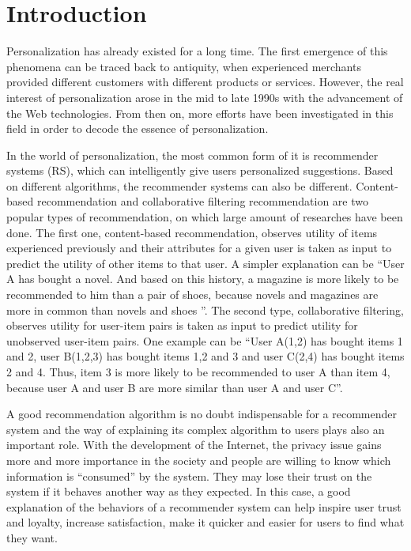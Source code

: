 \section{Introduction}

  \indent Personalization has already existed for a long time. The first emergence of this phenomena 
  can be traced back to antiquity,
  when experienced merchants provided different customers with different products or services\cite{adomavicius2008personalization}. However, 
  the real interest of personalization arose in the mid to late 1990s with the advancement of the Web technologies\cite{don2011managing}.
  From then on, more efforts have been investigated in this field in order to decode the essence of personalization.
  
  \indent In the world of personalization, the most common form of it is recommender systems (RS), which can intelligently
  give users personalized suggestions. Based on different algorithms, the recommender systems can also be different.
  Content-based recommendation and collaborative filtering recommendation are two popular types of recommendation, on which large amount 
  of researches have been done. The first one, content-based recommendation, observes utility of items experienced previously and
  their attributes for a given user is taken as input to predict the utility of other items to that user\cite{balabanovic1997fab}.
  A simpler explanation can be ``User A has bought a novel. And based on this history, a magazine is more likely to be recommended to him than a pair of shoes,
  because novels and magazines are more in common than novels and shoes ''. The second type, collaborative filtering, observes utility for user-item pairs is taken
  as input to predict utility for unobserved user-item pairs\cite{balabanovic1997fab}. One example can be ``User A(1,2) has bought items 1 and 2, user B(1,2,3) has bought items 1,2 and 3 and user C(2,4) has bought items 2 and 4.
  Thus, item 3 is more likely to be recommended to user A than item 4, because user A and user B are more similar than user A and user C''.
  
  \indent A good recommendation algorithm is no doubt indispensable for a recommender system and the way of explaining its complex algorithm to users
  plays also an important role. With the development of the Internet, the privacy issue gains more and more importance in the society
  and people are willing to know which information is ``consumed'' by the system. They may lose their trust on the system if
  it behaves another way as they expected. In this case, a good explanation of the behaviors of a recommender system 
  can help inspire user trust and loyalty, increase satisfaction, make it quicker and easier for users to find what they want\cite{tintarev2007survey}.

